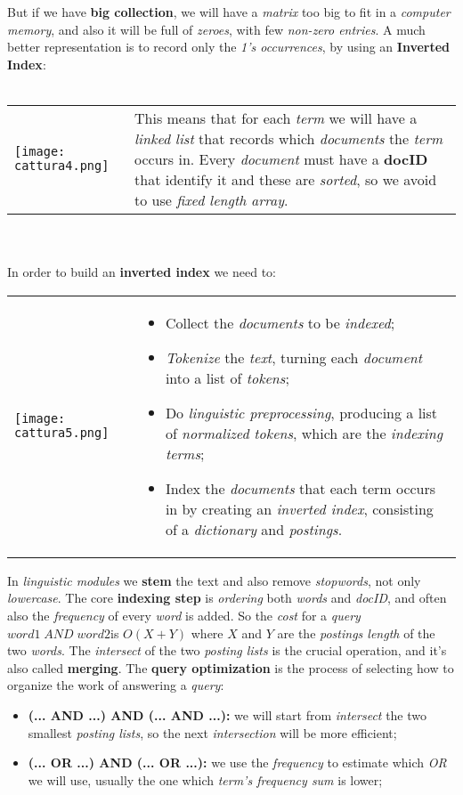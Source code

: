 \documentclass{article}
\begin{document}
But if we have \textbf{big collection}, we will have a \emph{matrix} too big to fit in a \emph{computer memory}, and also it will be full of \emph{zeroes}, with few \emph{non-zero entries}. A much better representation is to record only the\emph{ 1's occurrences}, by using an \textbf{Inverted Index}:\\\\
\begin{tabular}{C{8cm}  L{6.5cm}}
        \texttt{[image: cattura4.png]} & 
       This means that for each \emph{term} we will have a \emph{linked list }that records which \emph{documents} the \emph{term} occurs in. Every \emph{document} must have a \textbf{docID} that identify it and these are \emph{sorted}, so we avoid to use \emph{fixed length array}.
\end{tabular}\\\\
In order to build an \textbf{inverted index} we need to:\\
\begin{tabular}{C{7cm}  L{6.5cm}}
        \texttt{[image: cattura5.png]} & 
	\begin{itemize}
	\item Collect the \emph{documents} to be \emph{indexed};
	\item \emph{Tokenize} the \emph{text}, turning each \emph{document} into a list of \emph{tokens};
	\item Do \emph{linguistic preprocessing}, producing a list of \emph{normalized tokens}, which are the \emph{indexing terms};
	\item Index the \emph{documents} that each term occurs in by creating an \emph{inverted index}, consisting of a \emph{dictionary} and  \emph{postings}.
	\end{itemize}
\end{tabular}
\clearpage
\hfill \break
In \emph{linguistic modules} we \textbf{stem} the text and also remove \emph{stopwords}, not only \emph{lowercase}. The core \textbf{indexing step} is \emph{ordering} both \emph{words} and \emph{docID}, and often also the \emph{frequency} of every \emph{word} is added. So the \emph{cost} for a \emph{query} $word1\; AND\; word2 $is $O(X+Y)$ where $X$ and $Y$ are the \emph{postings length} of the two \emph{words}. The \emph{intersect} of the two \emph{posting lists} is the crucial operation, and it's also called \textbf{merging}. The \textbf{query optimization} is the process of selecting how to organize the work of answering a \emph{query}:
\begin{itemize}
\item \textbf{(... AND ...) AND (... AND ...):} we will start from \emph{intersect} the two smallest \emph{posting lists}, so the next \emph{intersection} will be more efficient;
\item \textbf{(... OR ...) AND (... OR ...):} we use the \emph{frequency} to estimate which \emph{OR} we will use, usually the one which \emph{term's frequency sum} is lower;
\end{itemize}
\end{document}
